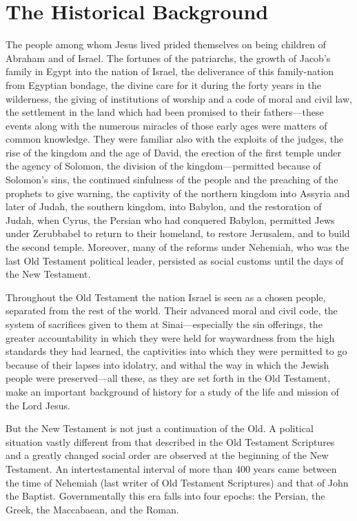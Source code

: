 \chapter{The Historical Background}\label{ch:the-historical-background}

The people among whom Jesus lived prided themselves on being children of Abraham and of Israel. The fortunes of the patriarchs, the growth of Jacob's family in Egypt into the nation of Israel, the deliverance of this family-nation from Egyptian bondage, the divine care for it during the forty years in the wilderness, the giving of institutions of worship and a code of moral and civil law, the settlement in the land which had been promised to their fathers---these events along with the numerous miracles of those early ages were matters of common knowledge. They were familiar also with the exploits of the judges, the rise of the kingdom and the age of David, the erection of the first temple under the agency of Solomon, the division of the kingdom---permitted because of Solomon's sins, the continued sinfulness of the people and the preaching of the prophets to give warning, the captivity of the northern kingdom into Assyria and later of Judah, the southern kingdom, into Babylon, and the restoration of Judah, when Cyrus, the Persian who had conquered Babylon, permitted Jews under Zerubbabel to return to their homeland, to restore Jerusalem, and to build the second temple. Moreover, many of the reforms under Nehemiah, who was the last Old Testament political leader, persisted as social customs until the days of the New Testament.

Throughout the Old Testament the nation Israel is seen as a chosen people, separated from the rest of the world. Their advanced moral and civil code, the system of sacrifices given to them at Sinai---especially the sin offerings, the greater accountability in which they were held for waywardness from the high standards they had learned, the captivities into which they were permitted to go because of their lapses into idolatry, and withal the way in which the Jewish people were preserved---all these, as they are set forth in the Old Testament, make an important background of history for a study of the life and mission of the Lord Jesus.

But the New Testament is not just a continuation of the Old. A political situation vastly different from that described in the Old Testament Scriptures and a greatly changed social order are observed at the beginning of the New Testament. An intertestamental interval of more than 400 years came between the time of Nehemiah (last writer of Old Testament Scriptures) and that of John the Baptist. Governmentally this era falls into four epochs: the Persian, the Greek, the Maccabaean, and the Roman.

